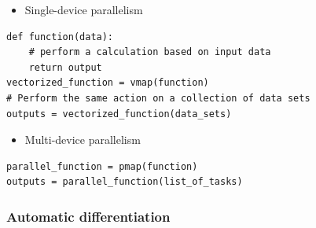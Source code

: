 \begin{frame}[fragile]

    \begin{itemize}
        \item Single-device parallelism
    \end{itemize}
    
    \begin{verbatim}
def function(data):
    # perform a calculation based on input data
    return output
vectorized_function = vmap(function)  
# Perform the same action on a collection of data sets
outputs = vectorized_function(data_sets)   
    \end{verbatim}

    \vspace{0.5em}
    \vspace{0.5em}
    \begin{itemize}
        \item Multi-device parallelism
    \end{itemize}

    \begin{verbatim}
parallel_function = pmap(function)  
outputs = parallel_function(list_of_tasks)  
    \end{verbatim}

\end{frame}



\begin{frame}
    \frametitle{Automatic differentiation}

    \begin{figure}
       \begin{center}
       \end{center}
    \end{figure}

\end{frame}



